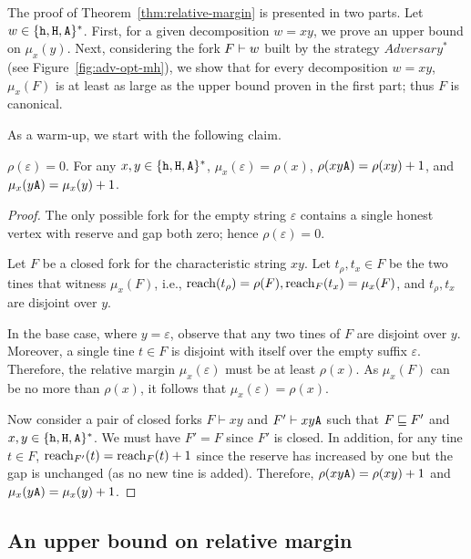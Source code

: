 

The proof of Theorem~\ref{thm:relative-margin} is presented in two parts. 
Let $w \in \{\mathtt{h}, \mathtt{H}, \mathtt{A}\}^*$.
First, for a given decomposition $w = xy$, 
we prove an upper bound on $\mu_x(y)$. 
Next, 
considering the fork $F \vdash w$ built by the strategy $Adversary^*$ 
(see Figure~\ref{fig:adv-opt-mh}), 
we show that 
for every decomposition $w = xy$, 
$\mu_x(F)$ is at least as large as the upper bound proven in the first part; 
thus $F$ is canonical. 

As a warm-up, we start with the following claim.

\begin{claim}\label{claim:rho-mu-A}
  $\rho(\varepsilon) = 0$. 
  For any $x, y \in \{\mathtt{h}, \mathtt{H}, \mathtt{A}\}^*$, 
  $\mu_x(\varepsilon) = \rho(x)$, 
  $\rho(xy\mathtt{A}) = \rho(xy) + 1$, 
  and $\mu_x(y\mathtt{A}) = \mu_x(y) + 1$.
\end{claim}
\begin{proof}
  The only possible fork for the empty string $\varepsilon$ 
  contains a single honest vertex 
  with reserve and gap both zero; 
  hence $\rho(\varepsilon) = 0$.

  Let $F$ be a closed fork for the characteristic string $xy$. 
  Let $t_\rho, t_x \in F$ be the two tines that witness $\mu_x(F)$, 
  i.e., $\operatorname{reach}(t_\rho) = \rho(F), \operatorname{reach}_F(t_x) = \mu_x(F)$, 
  and $t_\rho, t_x$ are disjoint over $y$. 


  In the base case, where $y=\varepsilon$, 
  observe that any two tines of $F$ 
  are disjoint over $y$. 
  Moreover, a single tine $t \in F$ 
  is disjoint with itself over the empty suffix $\varepsilon$. 
  Therefore, the relative margin $\mu_x(\varepsilon)$ must be at least $\rho(x)$. 
  As $\mu_x(F)$ can be no more than $\rho(x)$, it follows that 
  $\mu_x(\varepsilon) = \rho(x)$.


  Now consider a pair of closed forks $F\vdash xy$ and $F'\vdash xy\mathtt{A}$ 
  such that $F \sqsubseteq F'$ and $x,y\in\{\mathtt{h}, \mathtt{H}, \mathtt{A}\}^*$. 
  We must have $F' = F$ since $F'$ is closed. 
  In addition, for any tine $t \in F$, 
  $\operatorname{reach}_{F'}(t) = \operatorname{reach}_F(t) + 1$ 
  since the reserve has increased by one 
  but the gap is unchanged 
  (as no new tine is added). Therefore, 
  $\rho(xy\mathtt{A}) = \rho(xy) + 1$ and 
  $\mu_x(y\mathtt{A}) = \mu_x(y)+1$.
\end{proof}


\subsection{An upper bound on relative margin}

